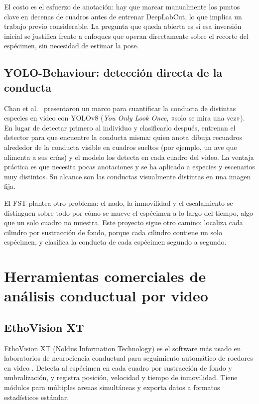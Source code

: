 El costo es el esfuerzo de anotación: hay que marcar manualmente los puntos clave en
decenas de cuadros antes de entrenar DeepLabCut, lo que implica un trabajo previo
considerable. La pregunta que queda abierta es si esa inversión inicial se justifica frente a
enfoques que operan directamente sobre el recorte del espécimen, sin necesidad de estimar
la pose.

\subsection{YOLO-Behaviour: detección directa de la conducta}

Chan et al.\ \cite{chan2025_yolo} presentaron un marco para cuantificar la conducta de distintas especies
en video con YOLOv8 (\textit{You Only Look Once}, «solo se mira una vez»). En lugar de detectar primero al individuo y clasificarlo después, entrenan
el detector para que encuentre la conducta misma: quien anota dibuja recuadros alrededor de
la conducta visible en cuadros sueltos (por ejemplo, un ave que alimenta a sus crías) y el
modelo los detecta en cada cuadro del video. La ventaja práctica es que necesita pocas
anotaciones y se ha aplicado a especies y escenarios muy distintos. Su alcance son las
conductas visualmente distintas en una imagen fija.

El FST plantea otro problema: el nado, la inmovilidad y el escalamiento se distinguen sobre
todo por cómo se mueve el espécimen a lo largo del tiempo, algo que un solo cuadro no
muestra. Este proyecto sigue otro camino: localiza cada cilindro por sustracción de fondo,
porque cada cilindro contiene un solo espécimen, y clasifica la conducta de cada espécimen
segundo a segundo.

\section{Herramientas comerciales de análisis conductual por video}

\subsection{EthoVision XT}

EthoVision XT (Noldus Information Technology) es el software más usado en laboratorios
de neurociencia conductual para seguimiento automático de roedores en video
\cite{noldus_ethovision}. Detecta al espécimen en cada cuadro por sustracción de fondo y
umbralización, y registra posición, velocidad y tiempo de inmovilidad. Tiene módulos
para múltiples arenas simultáneas y exporta datos a formatos estadísticos estándar.

